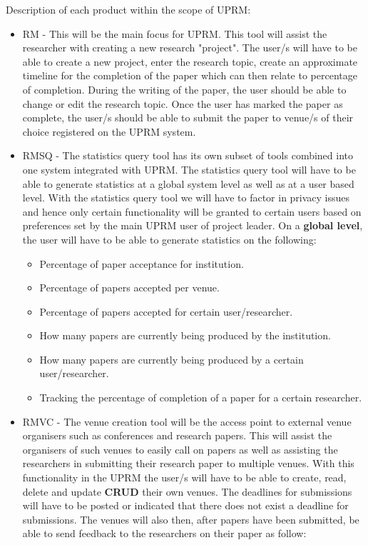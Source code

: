 		\begin{paragraph}{Description of each product within the scope of UPRM:}
				\begin{itemize}
					\item RM -
						This will be the main focus for UPRM. This tool will assist the researcher with creating a new research "project". 
						The user/s will have to be able to create a new project, enter the research topic, create an approximate timeline for the completion of the paper which can then relate to percentage of completion. During the writing of the paper, the user should be able to change or edit the research topic. Once the user has marked the paper as complete, the user/s should be able to submit the paper to venue/s of their choice registered on the UPRM system.
					\item RMSQ -
						The statistics query tool has its own subset of tools combined into one system integrated with UPRM. The statistics query tool will have to be able to generate statistics at a global system level as well as at a user based level. With the statistics query tool we will have to factor in privacy issues and hence only certain functionality will be granted to certain users based on preferences set by the main UPRM user of project leader. On a \textbf{global level}, the user will have to be able to generate statistics on the following: 
							\begin{itemize}
								\item Percentage of paper acceptance for institution.
								\item Percentage of papers accepted per venue.
								\item Percentage of papers accepted for certain user/researcher.
								\item How many papers are currently being produced by the institution.
								\item How many papers are currently being produced by a certain user/researcher.
								\item Tracking the percentage of completion of a paper for a certain researcher.
							\end{itemize}
					\item RMVC -
						The venue creation tool will be the access point to external venue organisers such as conferences and research papers. This will assist the organisers of such venues to easily call on papers as well as assisting the researchers in submitting their research paper to multiple venues. With this functionality in the UPRM the user/s will have to be able to create, read, delete and update \textbf{CRUD} their own venues. The deadlines for submissions will have to be posted or indicated that there does not exist a deadline for submissions. The venues will also then, after papers have been submitted, be able to send feedback to the researchers on their paper as follow:

\end{itemize}
\end{paragraph}
